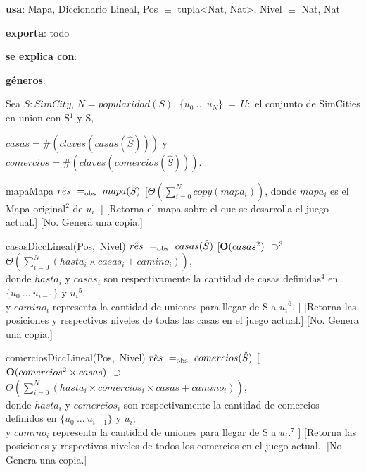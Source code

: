 \begin{Interfaz}
    \textbf{usa}: Mapa, Diccionario Lineal, Pos $\equiv$ tupla<Nat, Nat>, Nivel $\equiv$ Nat, Nat 
    
    \textbf{exporta}: todo

    \textbf{se explica con}: 
  
    \textbf{géneros}: 
    
    
    Sea $S: SimCity$, $N = popularidad(S)$, $\{u_0\ ...\ u_{N}\}\ =\ U:$ el conjunto de SimCities en union con S$^{1}$ y S, 

    $casas = \#(claves(casas(\hat{S})))$ y $comercios = \#(claves(comercios(\hat{S})))$.

    \vspace{4mm}
    \InterfazFuncion
    {mapa}{}{Mapa}
    {$\hat{res}\ =_{\mathrm{obs}}\ mapa(\hat{S})$}
    [$\Theta(\sum_{i = 0}^{N}{copy(mapa_i)})$,
        donde $mapa_i$ es el Mapa original$^{2}$ de $u_i$.
    ]
    [Retorna el mapa sobre el que se desarrolla el juego actual.]
    [No. Genera una copia.]

    \vspace{4mm}
    \InterfazFuncion
    {casas}{}{DiccLineal(Pos,\ Nivel)}
    {$\hat{res}\ =_{\mathrm{obs}}\ casas(\hat{S})$}
    [$\bold{O}(casas^{2})$ $\supset^{3}$ $\Theta(\sum_{i = 0}^{N}{(hasta_i \times casas_i + camino_i)})$, \\ \tab 
        donde $hasta_i$ y $casas_i$ son respectivamente la cantidad de casas definidas$^{4}$ en $\{u_0\ ...\ u_{i - 1}\}$ y $u_i$$^{5}$, \\
        \tab y $camino_i$ representa la cantidad de uniones para llegar de S a $u_i$$^{6}$.
    ]
    [Retorna las posiciones y respectivos niveles de todas las casas en el juego actual.]
    [No. Genera una copia.]

    \vspace{4mm}
    \InterfazFuncion
    {comercios}{}{DiccLineal(Pos,\ Nivel)}
    {$\hat{res}\ \igobs\ comercios(\hat{S})$}
    [$\bold{O}(comercios^{2} \times casas)$ $\supset$ $\Theta(\sum_{i = 0}^{N}{(hasta_i \times comercios_i \times casas + camino_i)})$,\\ \tab
        donde $hasta_i$ y $comercios_i$ son respectivamente la cantidad de comercios definidos en $\{u_0\ ...\ u_{i - 1}\}$ y $u_i$, 
        \\ \tab y $camino_i$ representa la cantidad de uniones para llegar de S a $u_i$.$^{7}$ 
    ]
    [Retorna las posiciones y respectivos niveles de todos los comercios en el juego actual.]
    [No. Genera una copia.]


\end{Interfaz}

